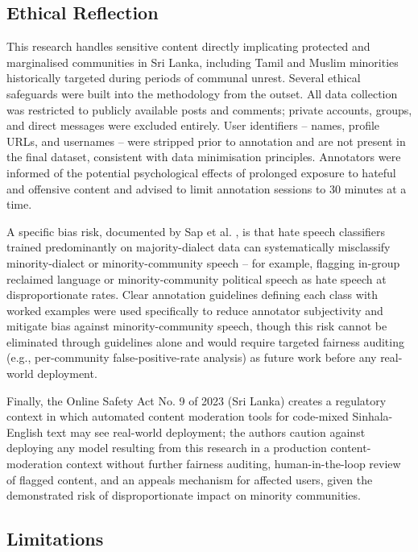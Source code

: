 \documentclass[journal]{IEEEtran}
\begin{document}

\subsection{Ethical Reflection}
\label{sec:ethics}

This research handles sensitive content directly implicating protected
and marginalised communities in Sri Lanka, including Tamil and Muslim
minorities historically targeted during periods of communal unrest.
Several ethical safeguards were built into the methodology from the
outset. All data collection was restricted to publicly available posts
and comments; private accounts, groups, and direct messages were
excluded entirely. User identifiers -- names, profile URLs, and
usernames -- were stripped prior to annotation and are not present in
the final dataset, consistent with data minimisation principles.
Annotators were informed of the potential psychological effects of
prolonged exposure to hateful and offensive content and advised to limit
annotation sessions to 30 minutes at a time.

A specific bias risk, documented by Sap et al. \cite{sap2019}, is that
hate speech classifiers trained predominantly on majority-dialect data
can systematically misclassify minority-dialect or minority-community
speech -- for example, flagging in-group reclaimed language or
minority-community political speech as hate speech at disproportionate
rates. Clear annotation guidelines defining each class with worked
examples were used specifically to reduce annotator subjectivity and
mitigate bias against minority-community speech, though this risk cannot
be eliminated through guidelines alone and would require targeted
fairness auditing (e.g., per-community false-positive-rate analysis) as
future work before any real-world deployment.

Finally, the Online Safety Act No. 9 of 2023 (Sri Lanka) creates a
regulatory context in which automated content moderation tools for
code-mixed Sinhala-English text may see real-world deployment; the
authors caution against deploying any model resulting from this research
in a production content-moderation context without further fairness
auditing, human-in-the-loop review of flagged content, and an appeals
mechanism for affected users, given the demonstrated risk of
disproportionate impact on minority communities.

\subsection{Limitations}
\label{sec:limitations}
\end{document}

